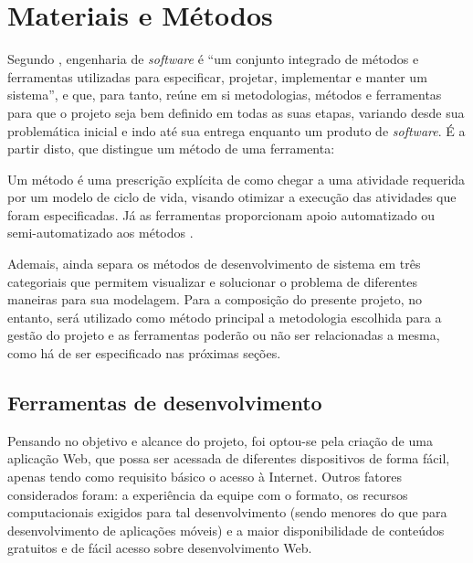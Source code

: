\chapter{Materiais e Métodos}
Segundo , engenharia de \textsl{software} é ``um conjunto integrado de métodos e ferramentas utilizadas para especificar, projetar, implementar e manter um sistema'', e que, para tanto, reúne em si metodologias, métodos e ferramentas para que o projeto seja bem definido em todas as suas etapas, variando desde sua problemática inicial e indo até sua entrega enquanto um produto de \textsl{software}. É a partir disto, que  distingue um método de uma ferramenta:

\begin{citacao}
Um método é uma prescrição explícita de como chegar a uma atividade requerida por um modelo de ciclo de vida, visando otimizar a execução das atividades que foram especificadas. Já as ferramentas proporcionam apoio automatizado ou semi-automatizado aos métodos \cite{Junior:2010}.
\end{citacao}

Ademais,  ainda separa os métodos de desenvolvimento de sistema em três categoriais que permitem visualizar e solucionar o problema de diferentes maneiras para sua modelagem. Para a composição do presente projeto, no entanto, será utilizado como método principal a metodologia escolhida para a gestão do projeto e as ferramentas poderão ou não ser relacionadas a mesma, como há de ser especificado nas próximas seções.

\section{Ferramentas de desenvolvimento}
Pensando no objetivo e alcance do projeto, foi optou-se pela criação de uma aplicação Web, que possa ser acessada de diferentes dispositivos de forma fácil, apenas tendo como requisito básico o acesso à Internet. Outros fatores considerados foram: a experiência da equipe com o formato, os recursos computacionais exigidos para tal desenvolvimento (sendo menores do que para desenvolvimento de aplicações móveis) e a maior disponibilidade de conteúdos gratuitos e de fácil acesso sobre desenvolvimento Web.

